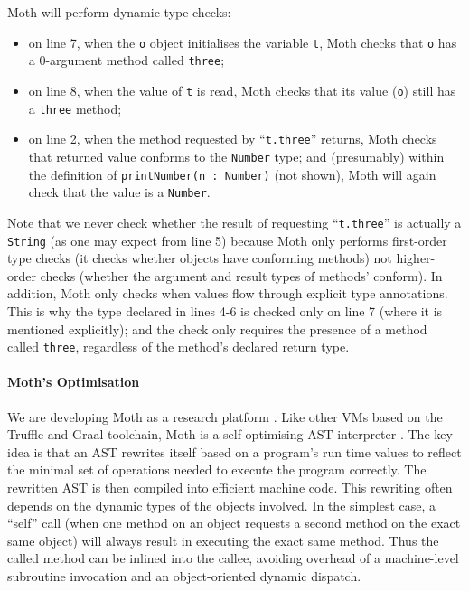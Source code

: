 \documentclass[sigplan,screen]{acmart}
\newcommand{\code}[1]{\texttt{#1}}
\begin{document}
Moth will perform dynamic type checks:

\begin{itemize}

\item on line 7,
when the \code{o} object initialises the variable \code{t},
Moth checks that \code{o} has a 0-argument method called \code{three};

\item on line 8,
when the value of \code{t} is read,
Moth checks that its value (\code{o}) still has a \code{three} method;

\item on line 2,
when the method requested by ``\code{t.three}'' returns,
Moth checks that returned value conforms to the \code{Number} type;
and (presumably) within the definition of
%
\code{printNumber(n :   Number)}
%
(not shown), Moth will again check that the value is a \code{Number}.
\end{itemize}

Note that we never check
whether the result of requesting ``\code{t.three}'' is actually
a \code{String} (as one may expect from line 5) because Moth only performs first-order type checks
(it checks whether objects have conforming methods) not higher-order
checks (whether the argument and result types of methods' conform). In addition, Moth
only checks when values flow through explicit type annotations.
This is why the type declared in lines 4-6 is checked only on line 7
(where it is mentioned explicitly); and the check only requires the
presence of a method called \code{three}, regardless of the method's
declared return type.

\paragraph{Moth's Optimisation}
We are developing Moth as a
research platform \cite{roberts-and-co-ecoop-2019}. Like other VMs
based on the Truffle and Graal toolchain, Moth is a self-optimising
AST interpreter \cite{Wurthinger:2012:SelfOptAST}. 
The key idea is that an AST rewrites itself based on a program's run time values
to reflect the minimal set of operations needed to execute the program
correctly. The rewritten AST is then compiled into efficient machine
code. This rewriting often depends on the dynamic types of the
objects involved. In the simplest case, a ``self'' call (when one method
on an object requests a second method on the exact same object) will
always result in executing the exact same method. Thus the called method can be inlined into
the callee, avoiding overhead of a machine-level subroutine
invocation and an object-oriented dynamic dispatch.
\end{document}
